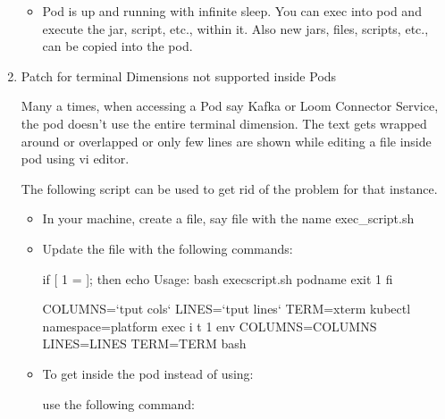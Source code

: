 \documentclass[letterpaper,10pt,english]{sphinxmanual}
\begin{document}
\begin{enumerate}
\begin{itemize}
\begin{itemize}
\end{itemize}

\item {} 
Pod is up and running with infinite sleep. You can exec into pod and execute the jar, script, etc., within it. Also new jars, files, scripts, etc., can be copied into the pod.

\end{itemize}

\item {} 
Patch for terminal Dimensions not supported inside Pods

Many a times, when accessing a Pod say Kafka or Loom Connector Service, the pod doesn’t use the entire terminal dimension. The text gets wrapped around or overlapped or only few lines are shown while editing a file inside pod using vi editor.

The following script can be used to get rid of the problem for that instance.
\begin{itemize}
\item {} 
In your machine, create a file, say file with the name exec\_script.sh

\item {} 
Update the file with the following commands:

\begin{sphinxVerbatim}[commandchars=\\\{\}]
if [ \PYGZdq{}\PYGZdl{}1\PYGZdq{} = \PYGZdq{}\PYGZdq{} ]; then
  echo \PYGZdq{}Usage: bash exec\PYGZus{}script.sh \PYGZlt{}pod\PYGZus{}name\PYGZgt{}\PYGZdq{}
  exit 1
fi

COLUMNS={}`tput cols{}`
LINES={}`tput lines{}`
TERM=xterm
kubectl \PYGZhy{}\PYGZhy{}namespace=platform exec \PYGZhy{}i \PYGZhy{}t \PYGZdl{}1 env COLUMNS=\PYGZdl{}COLUMNS LINES=\PYGZdl{}LINES TERM=\PYGZdl{}TERM bash
\end{sphinxVerbatim}

\item {} 
To get inside the pod instead of using:

\begin{sphinxVerbatim}[commandchars=\\\{\}]
    
\end{sphinxVerbatim}

use the following command:

\begin{sphinxVerbatim}[commandchars=\\\{\}]
  
\end{sphinxVerbatim}

\end{itemize}

\end{enumerate}
\end{document}
